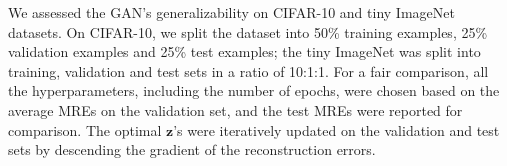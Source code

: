 We assessed the GAN's generalizability on CIFAR-10 and tiny ImageNet datasets. On CIFAR-10, we split the dataset into 50\% training examples, 25\% validation examples and 25\% test examples; the tiny ImageNet was split into training, validation and test sets in a ratio of 10:1:1. For a fair comparison, all the hyperparameters, including the number of epochs, were chosen based on the average MREs on the validation set, and the test MREs were reported for comparison. The optimal $\mathbf z$'s were iteratively updated on the validation and test sets by descending the gradient of the reconstruction errors.



